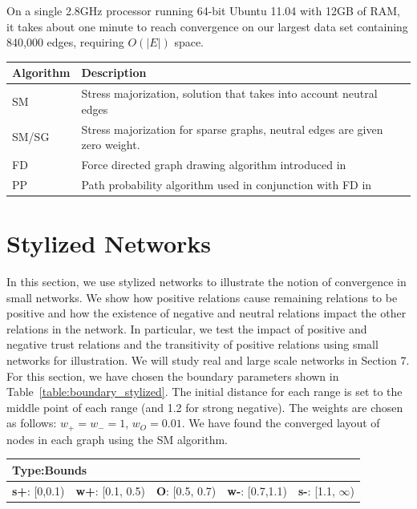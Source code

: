 \documentclass[acmtweb]{acmsmall}
\begin{document}
On a single 2.8GHz processor running 64-bit Ubuntu 11.04 with 12GB of
RAM, it takes about one minute to reach convergence on our largest
data set containing 840,000 edges, requiring $O(|E|)$ space.

\begin{table}[h]
{
\begin{tabular}{lp{4in}}
Algorithm & Description \\ \hline
SM & Stress majorization, solution that takes into account neutral edges \\
SM/SG & Stress majorization for sparse graphs, neutral edges are given zero weight. \\
FD & Force directed graph drawing algorithm introduced in~\cite{golbeck:distrust2011} \\
PP & Path probability algorithm used in conjunction with FD in~\cite{golbeck:distrust2011}
\end{tabular}}
\end{table}


\section{Stylized Networks} \label{sec:stylized}
In this section, we use stylized networks to illustrate the notion of
convergence in small networks.  We show how positive relations cause
remaining relations to be positive and how the existence of negative
and neutral relations impact the other relations in the network. In
particular, we test the impact of positive and negative trust
relations and the transitivity of positive relations using small
networks for illustration. We will study real and large scale networks
in Section 7. For this section, we have chosen the boundary parameters
shown in Table~\ref{table:boundary_stylized}. The initial distance for
each range is set to the middle point of each range (and 1.2 for
strong negative).  The weights are chosen as follows: $w_{+}=w_{-}=1$,
$w_{O}=0.01$. We have found the converged layout of nodes in each
graph using the SM algorithm.

\begin{table}[h]
 {
\begin{tabular}{lllll}
\multicolumn{5}{l}{Type:Bounds} \\ \hline
{\bf s+}: [0,0.1) & {\bf w+}: [0.1, 0.5) & {\bf O}: [0.5, 0.7)  & 
{\bf w-}: [0.7,1.1) & {\bf s-}: [1.1, $\infty$)
\end{tabular}}
\end{table}
\end{document}
